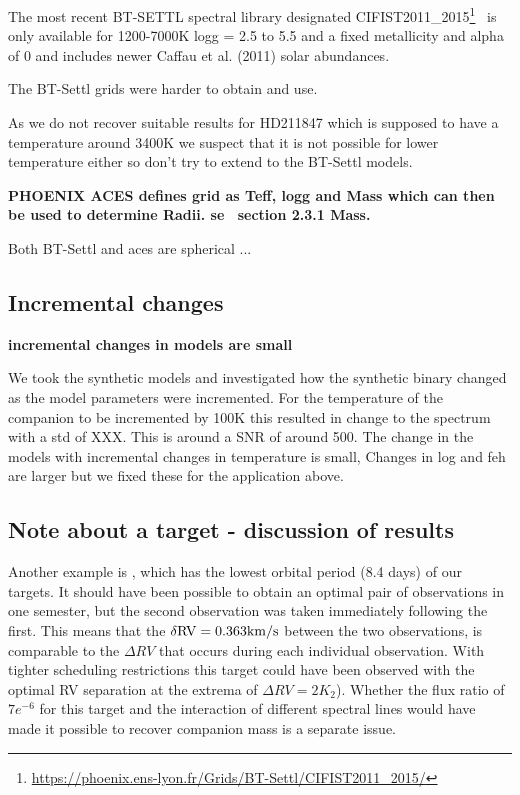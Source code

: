 The most recent BT-SETTL spectral library designated CIFIST2011\_2015\footnote{\url{https://phoenix.ens-lyon.fr/Grids/BT-Settl/CIFIST2011_2015/}}~\cite{baraffe_new_2015} is only available for 1200-7000K logg = 2.5 to 5.5 and a fixed metallicity and alpha of 0 and includes newer Caffau et al. (2011) solar abundances.

The BT-Settl grids were harder to obtain and use.

As we do not recover suitable results for HD211847 which is supposed to have a temperature around 3400K we suspect that it is not possible for lower temperature either so don't try to extend to the BT-Settl models. 


\textbf{
    PHOENIX ACES defines grid as Teff, logg and Mass which can then be used to determine Radii. se~\citep{husser_new_2013} section 2.3.1 Mass.}

Both BT-Settl and aces are spherical
...




\subsection{Incremental changes}
\textbf{incremental changes in models are small}

We took the synthetic models and investigated how the synthetic binary changed as the model parameters were incremented.  For the temperature of the companion to be incremented by 100K this resulted in change to the spectrum with a std of XXX. This is around a SNR of around 500.
The change in the models with incremental changes in temperature is small, Changes in log and feh are larger but we fixed these for the application above.





\subsection{Note about a target - discussion of results}
Another example is , which has the lowest orbital period (8.4 days) of our targets. It should have been possible to obtain an optimal pair of observations in one semester, but the second observation was taken immediately following the first. This means that the \(\rm \delta RV = 0.363 km/s \) between the two observations, is comparable to the \(\Delta RV \) that occurs during each individual observation. With tighter scheduling restrictions this target could have been observed with the optimal RV separation at the  extrema of \(\Delta RV=2 K_{2}\)). Whether the flux ratio of \(7e^{-6}\) for this target and the interaction of different spectral lines would have made it possible to recover companion mass is a separate issue.



